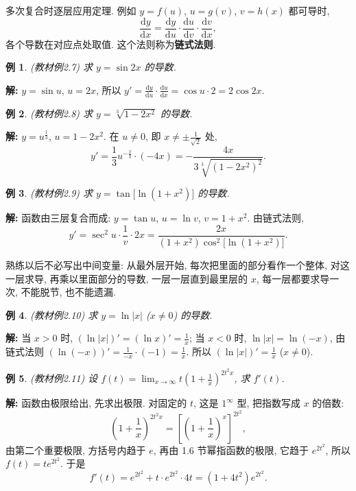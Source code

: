 \documentclass[UTF8,openany]{ctexbook}
\theoremstyle{chinesetextbook}
\newtheorem{example}{例}[section]
\newenvironment{cnsolution}{\par\indent\textbf{解:} \ignorespaces}{\par}
\newcommand{\dd}{\mathrm d}
\begin{document}
多次复合时逐层应用定理. 例如 $y=f(u)$, $u=g(v)$, $v=h(x)$ 都可导时,
\[
\frac{\dd y}{\dd x}=\frac{\dd y}{\dd u}\cdot\frac{\dd u}{\dd v}\cdot\frac{\dd v}{\dd x},
\]
各个导数在对应点处取值. 这个法则称为\textbf{链式法则}.
\begin{example}\label{ex:c2-2-7}
\textnormal{(教材例2.7)} 求 $y=\sin2x$ 的导数.
\end{example}
\begin{cnsolution}
$y=\sin u$, $u=2x$, 所以 $\displaystyle y'=\frac{\dd y}{\dd u}\cdot\frac{\dd u}{\dd x}=\cos u\cdot2=2\cos2x$.
\end{cnsolution}
\begin{example}\label{ex:c2-2-8}
\textnormal{(教材例2.8)} 求 $y=\sqrt[3]{1-2x^2}$ 的导数.
\end{example}
\begin{cnsolution}
$y=u^{\frac13}$, $u=1-2x^2$. 在 $u\ne0$, 即 $\displaystyle x\ne\pm\frac1{\sqrt2}$ 处,
\[
y'=\frac13u^{-\frac23}\cdot(-4x)=-\frac{4x}{3\sqrt[3]{(1-2x^2)^2}}.
\]
\end{cnsolution}
\begin{example}\label{ex:c2-2-9}
\textnormal{(教材例2.9)} 求 $y=\tan\bigl[\ln(1+x^2)\bigr]$ 的导数.
\end{example}
\begin{cnsolution}
函数由三层复合而成: $y=\tan u$, $u=\ln v$, $v=1+x^2$. 由链式法则,
\[
y'=\sec^2u\cdot\frac1v\cdot2x=\frac{2x}{(1+x^2)\cos^2\bigl[\ln(1+x^2)\bigr]}.
\]
\end{cnsolution}
熟练以后不必写出中间变量: 从最外层开始, 每次把里面的部分看作一个整体, 对这一层求导, 再乘以里面部分的导数, 一层一层直到最里层的 $x$, 每一层都要求导一次, 不能脱节, 也不能遗漏.
\begin{example}\label{ex:c2-2-10}
\textnormal{(教材例2.10)} 求 $y=\ln|x|$ ($x\ne0$) 的导数.
\end{example}
\begin{cnsolution}
当 $x>0$ 时, $\displaystyle(\ln|x|)'=(\ln x)'=\frac1x$; 当 $x<0$ 时, $\ln|x|=\ln(-x)$, 由链式法则 $\displaystyle(\ln(-x))'=\frac1{-x}\cdot(-1)=\frac1x$. 所以 $\displaystyle(\ln|x|)'=\frac1x$ ($x\ne0$).
\end{cnsolution}
\begin{example}\label{ex:c2-2-11}
\textnormal{(教材例2.11)} 设 $\displaystyle f(t)=\lim_{x\to\infty}t\left(1+\frac1x\right)^{2t^2x}$, 求 $f'(t)$.
\end{example}
\begin{cnsolution}
函数由极限给出, 先求出极限. 对固定的 $t$, 这是 $1^\infty$ 型, 把指数写成 $x$ 的倍数:
\[
\left(1+\frac1x\right)^{2t^2x}=\left[\left(1+\frac1x\right)^x\right]^{2t^2},
\]
由第二个重要极限, 方括号内趋于 $e$, 再由 1.6 节幂指函数的极限, 它趋于 $e^{2t^2}$, 所以 $f(t)=te^{2t^2}$. 于是
\[
f'(t)=e^{2t^2}+t\cdot e^{2t^2}\cdot4t=(1+4t^2)e^{2t^2}.
\]
\end{cnsolution}
\end{document}
